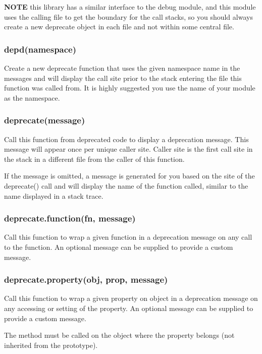 {\bfseries N\+O\+TE} this library has a similar interface to the {\ttfamily debug} module, and this module uses the calling file to get the boundary for the call stacks, so you should always create a new {\ttfamily deprecate} object in each file and not within some central file.

\subsubsection*{depd(namespace)}

Create a new deprecate function that uses the given namespace name in the messages and will display the call site prior to the stack entering the file this function was called from. It is highly suggested you use the name of your module as the namespace.

\subsubsection*{deprecate(message)}

Call this function from deprecated code to display a deprecation message. This message will appear once per unique caller site. Caller site is the first call site in the stack in a different file from the caller of this function.

If the message is omitted, a message is generated for you based on the site of the {\ttfamily deprecate()} call and will display the name of the function called, similar to the name displayed in a stack trace.

\subsubsection*{deprecate.\+function(fn, message)}

Call this function to wrap a given function in a deprecation message on any call to the function. An optional message can be supplied to provide a custom message.

\subsubsection*{deprecate.\+property(obj, prop, message)}

Call this function to wrap a given property on object in a deprecation message on any accessing or setting of the property. An optional message can be supplied to provide a custom message.

The method must be called on the object where the property belongs (not inherited from the prototype).

